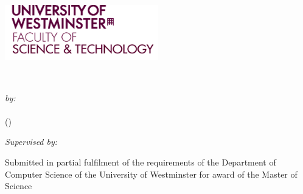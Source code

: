\begin{titlepage}

\includegraphics[width=0.5\textwidth]{./images/WestminsterLogo}~\\[1cm]


\begin{center}
{ \huge \bfseries \projecttitle \\[0.4cm] }

\noindent
\begin{minipage}{0.4\textwidth}
	 \begin{center}
	 \large
		\emph{by:}\\
		\studentfname{} \textsc{\studentlname{}}\\
		(\studentnumber)
	\end{center}
	\end{minipage}
\vfill
	 \begin{minipage}{0.4\textwidth}
	 \begin{center}
		 \large
			\emph{Supervised by:} \\
			\tutortitle{} \tutorfname{} \textsc{\tutorlname{}}
	\end{center}	
	\end{minipage}
\vfill

	\begin{minipage}{0.6\textwidth}
Submitted in partial fulfilment of the requirements of
the Department of Computer Science
of the University of Westminster
for award of the Master of Science\\
	\end{minipage}
\vfill
{\large \submitdate}\\

\end{center}
\end{titlepage}
